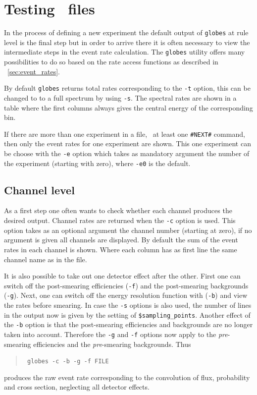 \section{Testing \AEDL\ files}
\label{sec:globes_test}

In the process of defining a new experiment the default output of {\tt globes}
at rule level is the final step but in order to arrive there it is often
necessary to view the intermediate steps in the event rate calculation. The 
{\tt globes} utility offers many possibilities to do so based on the 
rate access functions as described in \Sec~\ref{sec:event_rates}.

By default {\tt globes} returns total rates corresponding to the 
{\tt -t} option, this can be changed to
to a full spectrum by using {\tt -s}. The spectral rates are shown in a
table where the first columns always gives the central energy of the
corresponding bin.

If there are more than one experiment in a file, \ie\ at least one 
{\tt \#NEXT\#}
command, then only the event rates for one experiment are shown.  This
one experiment can be choose with the {\tt -e} option which takes 
as mandatory argument the number of the experiment (starting with zero), 
where {\tt -e0} is the default.

\subsection*{Channel level}

As a first step one often wants to check whether each channel produces the 
desired output. Channel rates are returned when the {\tt -c} option is used.
This option takes as an optional argument the channel number 
(starting at zero), if no argument is given all channels are displayed.
By default the sum of the event rates in each channel is shown. Where each 
column has as first line the same channel name as in the file. 

It is also possible to take out one detector effect after the other. First
one can switch off the post-smearing efficiencies ({\tt -f}) and the 
post-smearing backgrounds ({\tt -g}). Next, one can switch off the 
energy resolution function with ({\tt -b}) and view the rates before
smearing. In case the {\tt -s} options is also used, the number of
lines in the output now is given by the setting of {\tt \$sampling\_points}.
Another effect of the {\tt -b} option is that the post-smearing efficiencies
and backgrounds are no longer taken into account. Therefore the {\tt -g} 
and {\tt -f} options now apply to the \emph{pre}-smearing efficiencies 
and the \emph{pre}-smearing backgrounds. Thus 
\begin{quote}
{\tt
globes -c -b -g -f FILE
}
\end{quote}
produces the raw event rate corresponding to the convolution of flux, 
probability and cross section, neglecting all detector effects.

